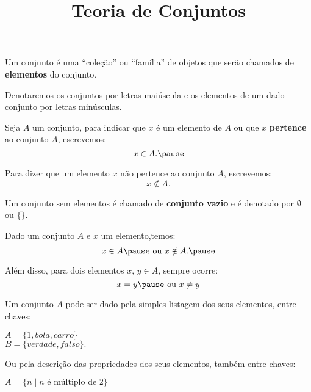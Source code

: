 \documentclass{beamer}
\title{Teoria de Conjuntos}
\author[\autor]{\autor}
\institute[\instituto]{\instituto}
\date{}
\begin{document}
    \begin{frame}
        \maketitle
    \end{frame}


    \begin{frame}
        \vspace{.4cm}
        Um conjunto é \pause uma ``coleção'' \pause ou ``família'' \pause de objetos que serão chamados de \textbf{elementos} do conjunto.\pause

        \vspace{.4cm}

        Denotaremos os conjuntos por letras maiúscula \pause e os elementos de um dado conjunto por letras minúsculas.\pause

        \vspace{.4cm}
        Seja $A$ um conjunto, \pause para indicar que $x$ é \pause um elemento de $A$ \pause ou que $x$ \textbf{pertence} ao conjunto $A$, \pause escrevemos:
        \[
            x \in A.\pause
        \]

        Para dizer que um elemento $x$ \pause não pertence ao conjunto $A$, escrevemos:\pause
        \[
            x \notin A.
        \]
    \end{frame}

    \begin{frame}
        Um conjunto sem elementos \pause é chamado de \textbf{conjunto vazio} \pause e é denotado por \pause $\emptyset$ ou \pause $\{\}$.\pause

        \vspace{.4cm}
        Dado um conjunto $A$ \pause e $x$ um elemento,\pause temos:\pause
        \[
            x \in A\pause \mbox{ ou } x \notin A.\pause
        \]

        Além disso, \pause para dois elementos \pause $x$, $y \in A$, \pause sempre ocorre:\pause
        \[
            x = y\pause \mbox{ ou } x \neq y
        \]
    \end{frame}

    \begin{frame}
        \vspace{.4cm}
        Um conjunto $A$ pode ser dado pela simples listagem dos seus elementos, entre chaves:\pause
            \begin{center}
                $A = \{1, bola, carro\}$\pause\\
                $B = \{verdade, falso\}.$\pause
            \end{center}


        Ou pela descrição das propriedades dos seus elementos, também  entre chaves:\pause
        \begin{center}
            $A = \{n \mid n \mbox{ é múltiplo de } 2\}$\pause
        \end{center}
    \end{frame}
\end{document}
